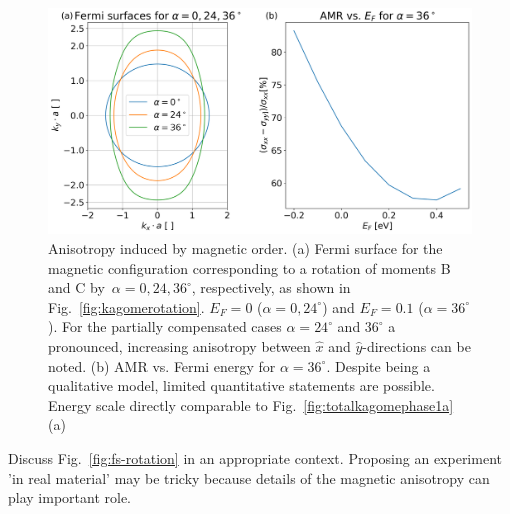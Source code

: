 \documentclass[prb,showpacs,amsmath,amssymb,superscriptaddress,twocolumn,floatfix]{revtex4-1}
\begin{document}
\begin{figure}
	\centering
	\includegraphics[width=\linewidth]{img/fig5}
	\caption{Anisotropy induced by magnetic order. (a) Fermi surface for the magnetic configuration corresponding to a rotation of moments B and C by~$\alpha = 0, 24, 36^\circ$, respectively, as shown in Fig.~\ref{fig:kagomerotation}. $E_F = 0$ ($\alpha = 0, 24^\circ$) and $E_F = 0.1$ ($\alpha = 36^\circ$). For the partially compensated cases $\alpha = 24^\circ$ and $36^\circ$ a pronounced, increasing anisotropy between $\hat{x}$ and $\hat{y}$-directions can be noted. (b) AMR vs. Fermi energy for $\alpha = 36^\circ$. Despite being a qualitative model, limited quantitative statements are possible. Energy scale directly comparable to Fig.~\ref{fig:totalkagomephase1a} (a)}
	\label{fig:asymmFS}
\end{figure}

{\color{red} Discuss Fig.~\ref{fig:fs-rotation} in an appropriate context.} 
Proposing an experiment 'in real material' may be tricky because details of the
magnetic anisotropy can play important role.
\end{document}
